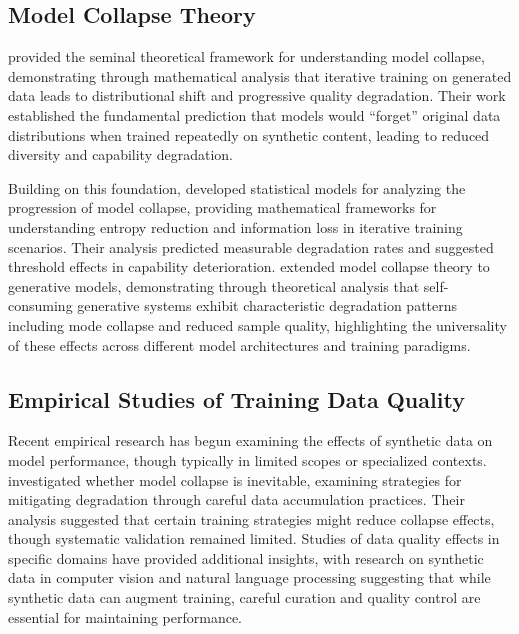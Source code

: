 \documentclass{article}
\begin{document}
\subsection{Model Collapse Theory}

\citet{shumailov2023curse} provided the seminal theoretical framework for understanding model collapse, demonstrating through mathematical analysis that iterative training on generated data leads to distributional shift and progressive quality degradation. Their work established the fundamental prediction that models would ``forget'' original data distributions when trained repeatedly on synthetic content, leading to reduced diversity and capability degradation.

Building on this foundation, \citet{seddik2024bad} developed statistical models for analyzing the progression of model collapse, providing mathematical frameworks for understanding entropy reduction and information loss in iterative training scenarios. Their analysis predicted measurable degradation rates and suggested threshold effects in capability deterioration. \citet{alemohammad2023self} extended model collapse theory to generative models, demonstrating through theoretical analysis that self-consuming generative systems exhibit characteristic degradation patterns including mode collapse and reduced sample quality, highlighting the universality of these effects across different model architectures and training paradigms.

\subsection{Empirical Studies of Training Data Quality}

Recent empirical research has begun examining the effects of synthetic data on model performance, though typically in limited scopes or specialized contexts. \citet{gerstgrasser2024model} investigated whether model collapse is inevitable, examining strategies for mitigating degradation through careful data accumulation practices. Their analysis suggested that certain training strategies might reduce collapse effects, though systematic validation remained limited. Studies of data quality effects in specific domains have provided additional insights, with research on synthetic data in computer vision \citep{borji2022pros} and natural language processing suggesting that while synthetic data can augment training, careful curation and quality control are essential for maintaining performance.
\end{document}
